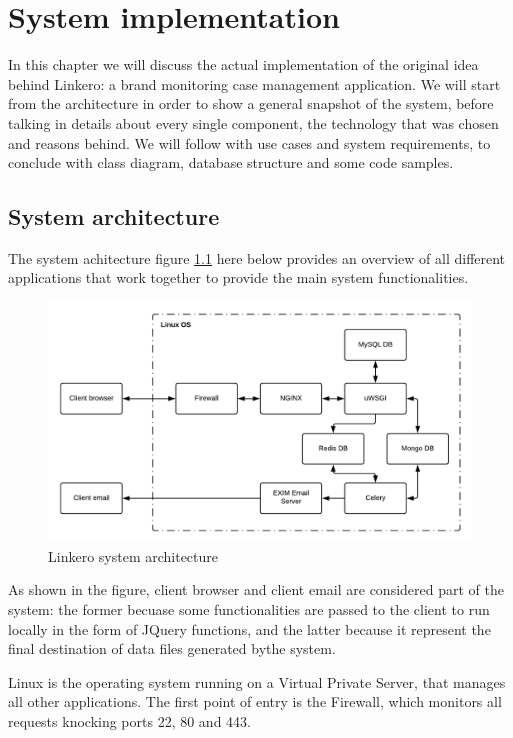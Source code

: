 \chapter{System implementation}

In this chapter we will discuss the actual implementation of the original idea
behind Linkero: a brand monitoring case management application. We will start
from the architecture in order to show a general snapshot of the system, before
talking in details about every single component, the technology that was
chosen and reasons behind. We will follow with use cases and
system requirements, to conclude with class diagram, database structure and some
code samples.

\section{System architecture}
The system achitecture figure \ref{fig:sysarch} here below provides an overview
of all different applications that work together to provide the main system
functionalities.

\begin{figure}[H]
\centering
\includegraphics[scale=0.7]{imgs/SystemArchitecture.pdf}
\caption{Linkero system architecture}
\label{fig:sysarch}
\end{figure}

As shown in the figure, client browser and client email are considered part of
the system: the former becuase some functionalities are passed to the client to
run locally in the form of JQuery functions, and the latter because it represent
the final destination of data files generated bythe system.

Linux is the operating system running on a Virtual Private Server, that manages
all other applications. The first point of entry is the Firewall, which monitors
all requests knocking ports 22, 80 and 443.

